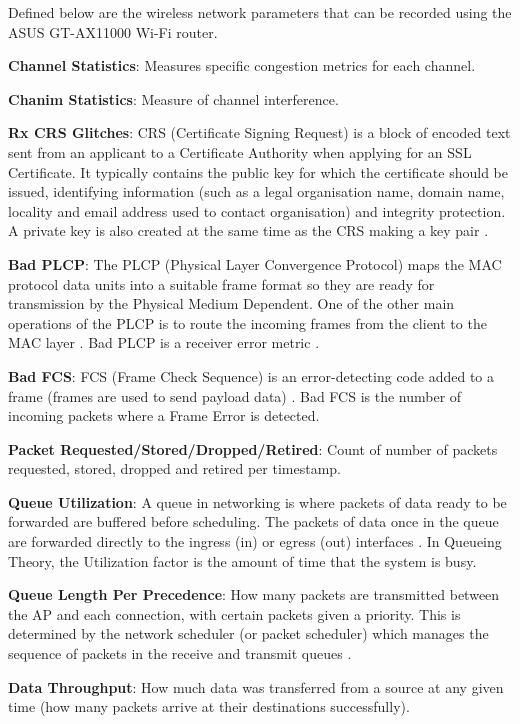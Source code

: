 Defined below are the wireless network parameters that can be recorded using the ASUS GT-AX11000 Wi-Fi router. 

\textbf{Channel Statistics}: Measures specific congestion metrics for each channel.

\textbf{Chanim Statistics}: Measure of channel interference.

\textbf{Rx CRS Glitches}: CRS (Certificate Signing Request) is a block of encoded text sent from an applicant to a Certificate Authority when applying for an SSL Certificate. It typically contains the public key for which the certificate should be issued, identifying information (such as a legal organisation name, domain name, locality and email address used to contact organisation) and integrity protection. A private key is also created at the same time as the CRS making a key pair \cite{CRS}. 

\textbf{Bad PLCP}: The PLCP (Physical Layer Convergence Protocol) maps the MAC protocol data units into a suitable frame format so they are ready for transmission by the Physical Medium Dependent. One of the other main operations of the PLCP is to route the incoming frames from the client to the MAC layer \cite{PLCP}. Bad PLCP is a receiver error metric \cite{PLCPPaper}. 

\textbf{Bad FCS}: FCS (Frame Check Sequence) is an error-detecting code added to a frame (frames are used to send payload data) \cite{FCS}. Bad FCS is the number of incoming packets where a Frame Error is detected. 

\textbf{Packet Requested/Stored/Dropped/Retired}: Count of number of packets requested, stored, dropped and retired per timestamp. 

\textbf{Queue Utilization}: A queue in networking is where packets of data ready to be forwarded are buffered before scheduling. The packets of data once in the queue are forwarded directly to the ingress (in) or egress (out) interfaces \cite{QOSPolicies}. In Queueing Theory, the Utilization factor is the amount of time that the system is busy. 

\textbf{Queue Length Per Precedence}: How many packets are transmitted between the AP and each connection, with certain packets given a priority. This is determined by the network scheduler (or packet scheduler) which manages the sequence of packets in the receive and transmit queues \cite{varghese_2005}. 

\textbf{Data Throughput}: How much data was transferred from a source at any given time (how many packets arrive at their destinations successfully). 

